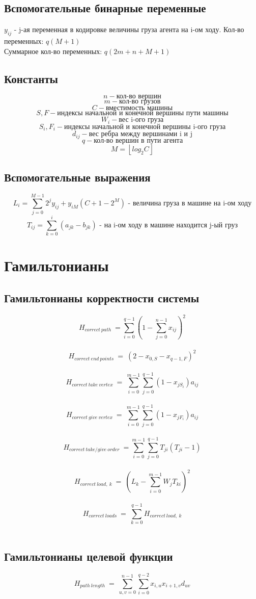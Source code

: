 \documentclass{article}
\begin{document}
\subsection{Вспомогательные бинарные переменные}
\(y_{ij}\) - j-ая переменная в кодировке величины груза агента на i-ом ходу. Кол-во переменных: \(q(M+1)\) \\

Суммарное кол-во переменных: \(q(2m + n + M + 1)\)


\subsection{Константы}
\[n - \text{кол-во вершин}\]
\[m - \text{кол-во грузов}\]
\[C - \text{вместимость машины}\]
\[S, F - \text{индексы начальной и конечной вершины пути машины}\]
\[W_i - \text{вес i-ого груза}\]
\[S_i, F_i - \text{индексы начальной и конечной вершины i-ого груза}\]
\[d_{ij} - \text{вес ребра между вершинами i и j}\]
\[q - \text{кол-во вершин в пути агента}\]
\[M = \left \lfloor{log_{2} C}\right \rfloor \]







\subsection{Вспомогательные выражения}
\[L_{i} = \sum_{j=0}^{M-1} 2^j y_{ij} + y_{i M} (C + 1 - 2^M) \text{ - величина груза в машине на i-ом ходу}\]
\[T_{ij} = \sum_{k=0}^{i} (a_{jk} - b_{jk}) \text{ - на i-ом ходу в машине находится j-ый груз}\]

\section{Гамильтонианы}

\subsection{Гамильтонианы корректности системы}

\[H_{correct \ path} \ = \sum_{i=0}^{q - 1} (1-\sum_{j=0}^{n-1}x_{ij})^2\]\\
\[H_{correct \ end \ points} \ = \ (2 - x_{0, S} -x_{q-1, F})^2 \]\\
\[H_{correct \ take \ vertex} \ =\ \sum_{i=0}^{m-1} \sum_{j=0}^{q-1}(1 - x_{jS_{i}})a_{ij} \]\\
\[H_{correct \ give \ vertex} \ =\ \sum_{i=0}^{m-1} \sum_{j=0}^{q-1}(1 - x_{jF_{i}})a_{ij} \]\\
\[H_{correct \ take/give \ order} \ =\sum_{i=0}^{m-1} \sum_{j=0}^{q-1} T_{ji} (T_{ji} - 1) \]\\

\[H_{correct \ load, \ k} \ =\ (L_{k} - \sum_{i=0}^{m-1} W_{j} T_{ki})^2 \]\\
\[H_{correct \ loads} \ =\ \sum_{k=0}^{q-1}H_{correct \ load, \ k}\]\\


\subsection{Гамильтонианы целевой функции}
\[H_{path \ length} \ =\ \sum_{u, v = 0}^{n-1} \sum_{i=0}^{q-2}x_{i,u}x_{i+1, v} d_{uv}\]\\
\end{document}
